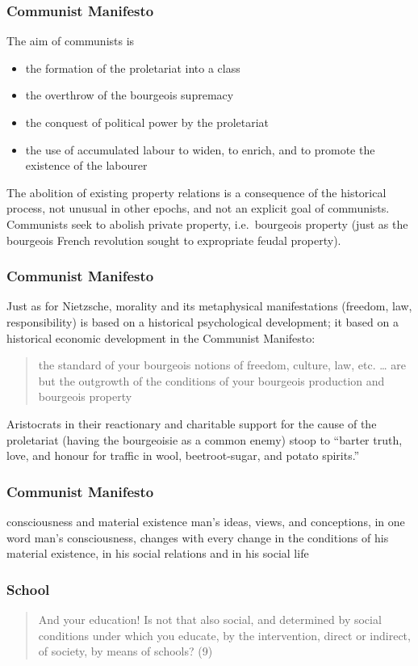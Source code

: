\documentclass[xcolor=dvipsnames]{beamer}
\begin{document}
\begin{frame}
  \frametitle{Communist Manifesto}
  The aim of communists is
  \begin{itemize}
  \item the formation of the proletariat into a class
  \item the overthrow of the bourgeois supremacy
  \item the conquest of political power by the proletariat
  \item the use of accumulated labour to widen, to enrich, and to
    promote the existence of the labourer
  \end{itemize}
  The abolition of existing property relations is a consequence of the
  historical process, not unusual in other epochs, and not an explicit
  goal of communists. Communists seek to abolish private property,
  i.e.\ bourgeois property (just as the bourgeois French revolution
  sought to expropriate feudal property). 
\end{frame}

\begin{frame}
  \frametitle{Communist Manifesto}
  Just as for Nietzsche, morality and its metaphysical manifestations
  (freedom, law, responsibility) is based on a historical
  psychological development; it based on a historical economic
  development in the Communist Manifesto:
  \begin{quote}
    the standard of your bourgeois notions of freedom, culture, law,
    etc. {\ldots} are but the outgrowth of the conditions of your
    bourgeois production and bourgeois property
  \end{quote}
  Aristocrats in their reactionary and charitable support for the
  cause of the proletariat (having the bourgeoisie as a common enemy)
  stoop to ``barter truth, love, and honour for traffic in wool,
  beetroot-sugar, and potato spirits.''
\end{frame}

\begin{frame}
  \frametitle{Communist Manifesto}
  \begin{block}{consciousness and material existence}
    man's ideas, views, and conceptions, in one word man's
    consciousness, changes with every change in the conditions of his
    material existence, in his social relations and in his social life
  \end{block}
\end{frame}

\begin{frame}
  \frametitle{School}
  \begin{quote}
And your education! Is not that also social, and determined by social
conditions under which you educate, by the intervention, direct or
indirect, of society, by means of schools? (9)
  \end{quote}
\end{frame}
\end{document}
